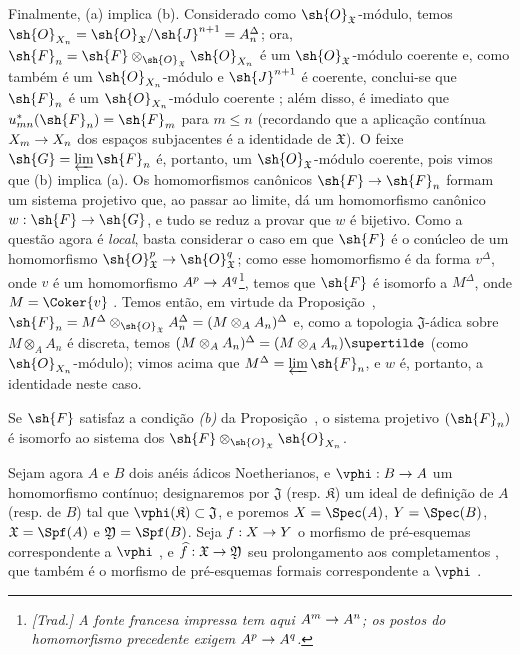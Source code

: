 \documentclass[oneside]{amsart}
\makeatletter
\renewcommand{\leq}{\leqslant}
\newcommand{\ega@arrow}[2]{\mathchoice{#1}{#2}{#2}{#2}}
\renewcommand{\to}{\ega@arrow{\longrightarrow}{\rightarrow}}
\let\EGAOriginalLabel\label
\renewcommand{\label}[1]{\phantomsection\EGAOriginalLabel{#1}}
\makeatother
\begin{document}
Finalmente, (a) implica (b).
Considerado como $\sh{O}_\mathfrak{X}$-módulo, temos $\sh{O}_{X_n}=\sh{O}_\mathfrak{X}/\sh{J}^{n+1}=A_n^\Delta$; ora, $\sh{F}_n=\sh{F}\otimes_{\sh{O}_\mathfrak{X}}\sh{O}_{X_n}$ é um $\sh{O}_\mathfrak{X}$-módulo coerente  e, como também é um $\sh{O}_{X_n}$-módulo e $\sh{J}^{n+1}$ é coerente, conclui-se que $\sh{F}_n$ é um $\sh{O}_{X_n}$-módulo coerente ; além disso, é imediato que $u_{mn}^*(\sh{F}_n)=\sh{F}_m$ para $m\leq n$ (recordando que a aplicação contínua $X_m\to X_n$ dos espaços subjacentes é a identidade de $\mathfrak{X}$).
O feixe $\sh{G}=\varprojlim\sh{F}_n$ é, portanto, um $\sh{O}_\mathfrak{X}$-módulo coerente, pois vimos que (b) implica (a). Os homomorfismos canônicos $\sh{F}\to\sh{F}_n$ formam um sistema projetivo que, ao passar ao limite, dá um homomorfismo canônico $w:\sh{F}\to\sh{G}$, e tudo se reduz a provar que $w$ é bijetivo.
Como a questão agora é \emph{local}, basta considerar o caso em que $\sh{F}$ é o conúcleo de um homomorfismo $\sh{O}_\mathfrak{X}^p\to\sh{O}_\mathfrak{X}^q$; como esse homomorfismo é da forma $v^\Delta$, onde $v$ é um homomorfismo $A^p\to A^q$\footnote{\emph{[Trad.] A fonte francesa impressa tem aqui $A^m\to A^n$; os postos do homomorfismo precedente exigem $A^p\to A^q$.}}, temos que $\sh{F}$ é isomorfo a $M^\Delta$, onde $M=\Coker{v}$ .
Temos então, em virtude da Proposição~, $\sh{F}_n=M^\Delta\otimes_{\sh{O}_\mathfrak{X}}A_n^\Delta=(M\otimes_A A_n)^\Delta$ e, como a topologia $\mathfrak{J}$-ádica sobre $M\otimes_A A_n$ é discreta, temos $(M\otimes_A A_n)^\Delta=(M\otimes_A A_n)\supertilde$ (como $\sh{O}_{X_n}$-módulo); vimos acima que $M^\Delta=\varprojlim\sh{F}_n$, e $w$ é, portanto, a identidade neste caso.

\begin{corollary}[10.10.6]
\label{I.10.10.6}
Se $\sh{F}$ satisfaz a condição \emph{(b)} da Proposição~, o sistema projetivo $(\sh{F}_n)$ é isomorfo ao sistema dos $\sh{F}\otimes_{\sh{O}_\mathfrak{X}}\sh{O}_{X_n}$.
\end{corollary}

\begin{env}[10.10.7]
\label{I.10.10.7}
Sejam agora $A$ e $B$ dois anéis ádicos Noetherianos, e $\vphi:B\to A$ um homomorfismo contínuo; designaremos por $\mathfrak{J}$ (resp. $\mathfrak{K}$) um ideal de definição de $A$ (resp. de $B$) tal que $\vphi(\mathfrak{K})\subset\mathfrak{J}$, e poremos $X=\Spec(A)$, $Y=\Spec(B)$, $\mathfrak{X}=\Spf(A)$ e $\mathfrak{Y}=\Spf(B)$.
Seja $f:X\to Y$ o morfismo de pré-esquemas correspondente a $\vphi$ , e $\widehat{f}:\mathfrak{X}\to\mathfrak{Y}$ seu prolongamento aos completamentos , que também é o morfismo de pré-esquemas formais correspondente a $\vphi$ .
\end{env}
\end{document}

